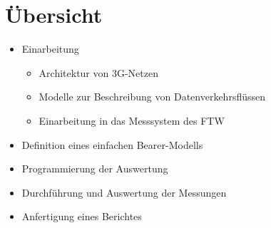 











\section{Übersicht}

\begin{itemize}
\item Einarbeitung
	\begin{itemize}
		\item Architektur von 3G-Netzen
		\item Modelle zur Beschreibung von Datenverkehrsflüssen
		\item Einarbeitung in das Messsystem des FTW
	\end{itemize}
\item Definition eines einfachen Bearer-Modells
\item Programmierung der Auswertung
\item Durchführung und Auswertung der Messungen
\item Anfertigung eines Berichtes
\end{itemize}

